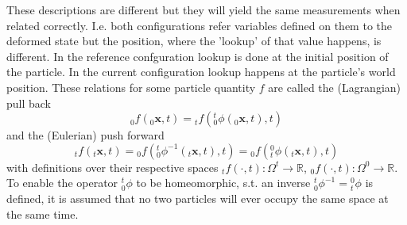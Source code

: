 \documentclass[m,times]{cgMA}
\begin{document}
These descriptions are different but they will yield the same measurements when related correctly. I.e. both configurations refer variables defined on them to the deformed state but the position, where the 'lookup' of that value happens, is different. In the reference confguration lookup is done at the initial position of the particle. In the current configuration lookup happens at the particle's world position. These relations for some particle quantity $f$ are called the (Lagrangian) pull back
\begin{equation}
  _0f(_0\boldsymbol{x},t)= {_tf}({^t_0}\phi(_0\boldsymbol{x},t),t)
\end{equation}
and the (Eulerian) push forward
\begin{equation}\label{eq:push_forward}
  _tf(_t\boldsymbol{x},t) =  {_0f}({^t_0}\phi^{-1}(_t\boldsymbol{x},t),t) = {_0f}({_t^0}\phi(_t\boldsymbol{x},t),t)
\end{equation}
with definitions over their respective spaces $_tf ( \cdot , t ) : \Omega ^ {  { t } } \rightarrow \mathbb { R }$, $_0f ( \cdot , t ) : \Omega ^ {   { 0 } } \rightarrow \mathbb { R }$.  To enable the operator ${^t_0}\phi$ to be homeomorphic, s.t. an inverse ${^t_0}\phi^{-1} = {_t^0}\phi$ is defined, it is assumed that no two particles will ever occupy the same space at the same time.
\end{document}
